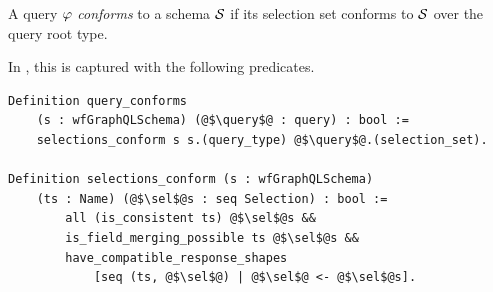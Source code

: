 \begin{definition}
A \gql query $\varphi$ \textit{conforms} to a schema $\mathcal{S}$ if its selection set conforms to $\mathcal{S}$ over the query root type.
\end{definition}


In \gcoql, this is captured with the following predicates.


\begin{verbatim}
Definition query_conforms 
    (s : wfGraphQLSchema) (@$\query$@ : query) : bool :=
    selections_conform s s.(query_type) @$\query$@.(selection_set).
    
Definition selections_conform (s : wfGraphQLSchema)
    (ts : Name) (@$\sel$@s : seq Selection) : bool :=
        all (is_consistent ts) @$\sel$@s &&
        is_field_merging_possible ts @$\sel$@s &&
        have_compatible_response_shapes
            [seq (ts, @$\sel$@) | @$\sel$@ <- @$\sel$@s].

\end{verbatim}



